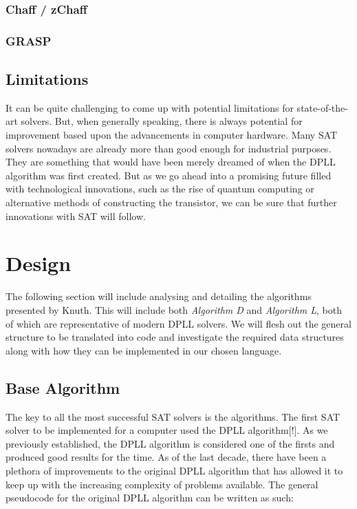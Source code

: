 \documentclass{article}
\begin{document}
\subsubsection{Chaff / zChaff}
\lipsum[2-3]
\subsubsection{GRASP}
\lipsum[2-3]

\subsection{Limitations}
It can be quite challenging to come up with potential limitations for state-of-the-art solvers. But, when generally speaking,
there is always potential for improvement based upon the advancements in computer hardware. Many SAT solvers nowadays are already
more than good enough for industrial purposes. They are something that would have been merely dreamed of when the DPLL algorithm
was first created. But as we go ahead into a promising future filled with technological innovations, such as the rise of quantum
computing or alternative methods of constructing the transistor, we can be sure that further innovations with SAT will follow.

\section{Design}
The following section will include analysing and detailing the algorithms presented by Knuth. This will include both
\textit{Algorithm D} and \textit{Algorithm L}, both of which are representative of modern DPLL solvers. We will flesh out the
general structure to be translated into code and investigate the required data structures along with how they can be implemented
in our chosen language.

\subsection{Base Algorithm}
The key to all the most successful SAT solvers is the algorithms. The first SAT solver to be implemented for a computer used the
DPLL algorithm[!]. As we previously established, the DPLL algorithm is considered one of the firsts and produced good results for
the time. As of the last decade, there have been a plethora of improvements to the original DPLL algorithm that has allowed it to
keep up with the increasing complexity of problems available. The general pseudocode for the original DPLL algorithm can be
written as such:
\end{document}
